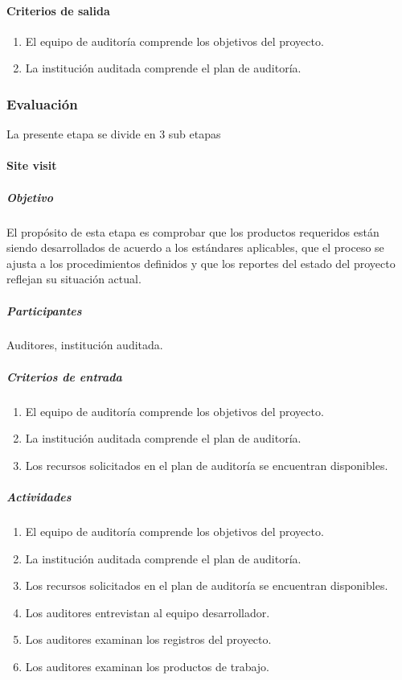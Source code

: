 \paragraph{Criterios de salida}

\begin{enumerate}
	\item
	El equipo de auditoría comprende los objetivos del proyecto.
	\item
	La institución auditada comprende el plan de auditoría.
\end{enumerate}

\subsubsection{Evaluación}

La presente etapa se divide en 3 sub etapas

\paragraph{Site visit}

\subparagraph{Objetivo\\}

El propósito de esta etapa es comprobar que los productos requeridos están siendo desarrollados de acuerdo a los estándares aplicables, que el proceso se ajusta a los procedimientos definidos y que los reportes del estado del proyecto reflejan su situación actual.

\subparagraph{Participantes\\}

Auditores, institución auditada.

\subparagraph{Criterios de entrada\\}

\begin{enumerate}
	\item
		El equipo de auditoría comprende los objetivos del proyecto.
	\item
		La institución auditada comprende el plan de auditoría.
	\item
		Los recursos solicitados en el plan de auditoría se encuentran disponibles.
\end{enumerate}

\subparagraph{Actividades\\}

\begin{enumerate}
	\item
		El equipo de auditoría comprende los objetivos del proyecto.
	\item
		La institución auditada comprende el plan de auditoría.
	\item
		Los recursos solicitados en el plan de auditoría se encuentran disponibles.
	\item
		Los auditores entrevistan al equipo desarrollador. 
	\item
		Los auditores examinan los registros del proyecto.
	\item
		Los auditores examinan los productos de trabajo.
\end{enumerate}

